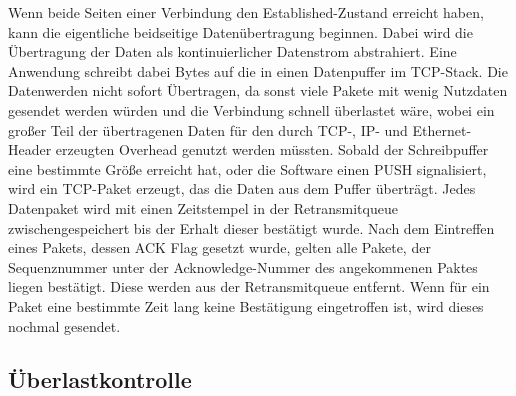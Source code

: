 Wenn beide Seiten einer Verbindung den Established-Zustand erreicht haben, kann die eigentliche beidseitige Datenübertragung beginnen. Dabei wird die Übertragung der Daten als kontinuierlicher Datenstrom abstrahiert. Eine Anwendung schreibt dabei Bytes auf die in einen Datenpuffer im TCP-Stack. Die Datenwerden nicht sofort Übertragen, da sonst viele Pakete mit wenig Nutzdaten gesendet werden würden und die Verbindung schnell überlastet wäre, wobei ein großer Teil der übertragenen Daten für den durch TCP-, IP- und Ethernet-Header erzeugten Overhead genutzt werden müssten. Sobald der Schreibpuffer eine bestimmte Größe erreicht hat, oder die Software einen PUSH signalisiert, wird ein TCP-Paket erzeugt, das die Daten aus dem Puffer überträgt. Jedes Datenpaket wird mit einen Zeitstempel in der Retransmitqueue zwischengespeichert bis der Erhalt dieser bestätigt wurde. Nach dem Eintreffen eines Pakets, dessen ACK Flag gesetzt wurde, gelten alle Pakete, der Sequenznummer unter der Acknowledge-Nummer des angekommenen Paktes liegen bestätigt. Diese werden aus der Retransmitqueue entfernt. Wenn für ein Paket eine bestimmte Zeit lang keine Bestätigung eingetroffen ist, wird dieses nochmal gesendet. 

\subsection{Überlastkontrolle}


